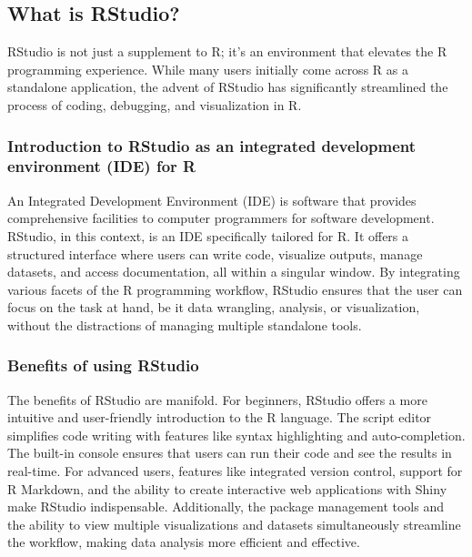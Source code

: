 \documentclass[
  b5paper]{book}
\begin{document}
\hypertarget{what-is-rstudio}{%
\subsection*{What is RStudio?}\label{what-is-rstudio}}

RStudio is not just a supplement to R; it's an environment that elevates the R programming experience. While many users initially come across R as a standalone application, the advent of RStudio has significantly streamlined the process of coding, debugging, and visualization in R.

\hypertarget{introduction-to-rstudio-as-an-integrated-development-environment-ide-for-r}{%
\subsubsection*{Introduction to RStudio as an integrated development environment (IDE) for R}\label{introduction-to-rstudio-as-an-integrated-development-environment-ide-for-r}}

An Integrated Development Environment (IDE) is software that provides comprehensive facilities to computer programmers for software development. RStudio, in this context, is an IDE specifically tailored for R. It offers a structured interface where users can write code, visualize outputs, manage datasets, and access documentation, all within a singular window. By integrating various facets of the R programming workflow, RStudio ensures that the user can focus on the task at hand, be it data wrangling, analysis, or visualization, without the distractions of managing multiple standalone tools.

\hypertarget{benefits-of-using-rstudio}{%
\subsubsection*{Benefits of using RStudio}\label{benefits-of-using-rstudio}}

The benefits of RStudio are manifold. For beginners, RStudio offers a more intuitive and user-friendly introduction to the R language. The script editor simplifies code writing with features like syntax highlighting and auto-completion. The built-in console ensures that users can run their code and see the results in real-time. For advanced users, features like integrated version control, support for R Markdown, and the ability to create interactive web applications with Shiny make RStudio indispensable. Additionally, the package management tools and the ability to view multiple visualizations and datasets simultaneously streamline the workflow, making data analysis more efficient and effective.
\end{document}
